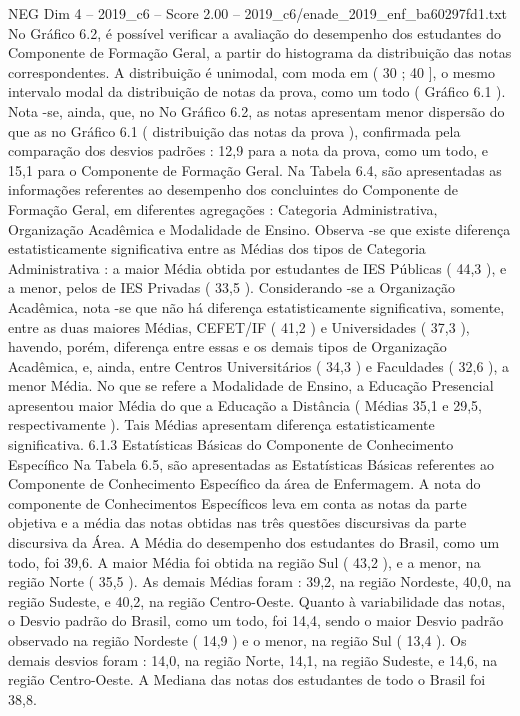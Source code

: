 \begin{textsample}{NEG Dim 4 – 2019\_c6 – Score 2.00 – 2019\_c6/enade\_2019\_enf\_ba60297fd1.txt}
No Gráfico 6.2, é possível verificar a avaliação do desempenho dos estudantes do Componente de Formação Geral, a partir do histograma da distribuição das notas correspondentes.
A distribuição é unimodal, com moda em ( 30 ; 40 ], o mesmo intervalo modal da distribuição de notas da prova, como um todo ( Gráfico 6.1 ).
Nota -se, ainda, que, no No Gráfico 6.2, as notas apresentam menor dispersão do que as no Gráfico 6.1 ( distribuição das notas da prova ), confirmada pela comparação dos desvios padrões : 12,9 para a nota da prova, como um todo, e 15,1 para o Componente de Formação Geral.
Na Tabela 6.4, são apresentadas as informações referentes ao desempenho dos concluintes do Componente de Formação Geral, em diferentes agregações : Categoria Administrativa, Organização Acadêmica e Modalidade de Ensino.
Observa -se que existe diferença estatisticamente significativa entre as Médias dos tipos de Categoria Administrativa : a maior Média obtida por estudantes de IES Públicas ( 44,3 ), e a menor, pelos de IES Privadas ( 33,5 ).
Considerando -se a Organização Acadêmica, nota -se que não há diferença estatisticamente significativa, somente, entre as duas maiores Médias, CEFET/IF ( 41,2 ) e Universidades ( 37,3 ), havendo, porém, diferença entre essas e os demais tipos de Organização Acadêmica, e, ainda, entre Centros Universitários ( 34,3 ) e Faculdades ( 32,6 ), a menor Média.
No que se refere a Modalidade de Ensino, a Educação Presencial apresentou maior Média do que a Educação a Distância ( Médias 35,1 e 29,5, respectivamente ).
Tais Médias apresentam diferença estatisticamente significativa. 6.1.3 Estatísticas Básicas do Componente de Conhecimento Específico Na Tabela 6.5, são apresentadas as Estatísticas Básicas referentes ao Componente de Conhecimento Específico da área de Enfermagem.
A nota do componente de Conhecimentos Específicos leva em conta as notas da parte objetiva e a média das notas obtidas nas três questões discursivas da parte discursiva da Área.
A Média do desempenho dos estudantes do Brasil, como um todo, foi 39,6.
A maior Média foi obtida na região Sul ( 43,2 ), e a menor, na região Norte ( 35,5 ).
As demais Médias foram : 39,2, na região Nordeste, 40,0, na região Sudeste, e 40,2, na região Centro-Oeste.
Quanto à variabilidade das notas, o Desvio padrão do Brasil, como um todo, foi 14,4, sendo o maior Desvio padrão observado na região Nordeste ( 14,9 ) e o menor, na região Sul ( 13,4 ).
Os demais desvios foram : 14,0, na região Norte, 14,1, na região Sudeste, e 14,6, na região Centro-Oeste.
A Mediana das notas dos estudantes de todo o Brasil foi 38,8.

\end{textsample}
